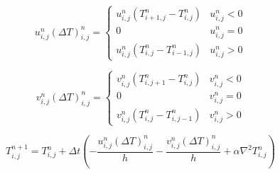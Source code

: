 \begin{equation}
    u_{i, j}^{n} (\Delta T)_{i, j}^{n} = \begin{cases} 
          u_{i, j}^{n} \left( T_{i + 1, j}^{n} - T_{i, j}^{n} \right) & u_{i, j}^{n} < 0 \\
          0 & u_{i, j}^n = 0 \\
          u_{i, j}^{n} \left( T_{i, j}^{n} - T_{i - 1, j}^{n} \right) & u_{i, j}^n > 0 
       \end{cases}
\end{equation}

\begin{equation}
    v_{i, j}^{n} (\Delta T)_{i, j}^{n} = \begin{cases} 
          v_{i, j}^{n} \left( T_{i, j + 1}^{n} - T_{i, j}^{n} \right) & v_{i, j}^{n} < 0 \\
          0 & v_{i, j}^n = 0 \\
          v_{i, j}^{n} \left( T_{i, j}^{n} - T_{i, j - 1}^{n} \right) & v_{i, j}^n > 0 
       \end{cases}
\end{equation}





\begin{equation}
    T_{i, j}^{n + 1} = T_{i, j}^{n} + \Delta t \left( -\frac{u_{i, j}^{n} (\Delta T)_{i, j}^{n}}{h} - \frac{ v_{i, j}^{n} (\Delta T)_{i, j}^{n}}{h} + \alpha \nabla^2 T_{i, j}^{n} \right)
\end{equation}

\clearpage